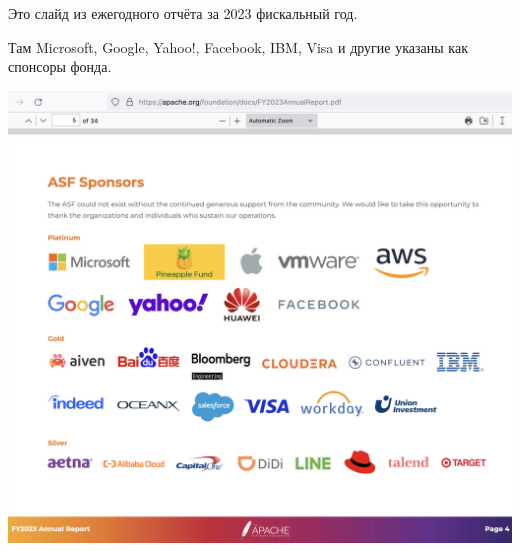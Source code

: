 
Это слайд из ежегодного отчёта \Asf за 2023 фискальный год.

Там Microsoft, Google, Yahoo!, Facebook, IBM, Visa и другие указаны как спонсоры фонда.

\includegraphics[width=\textwidth]{apache-sponsors}

\pagebreak
